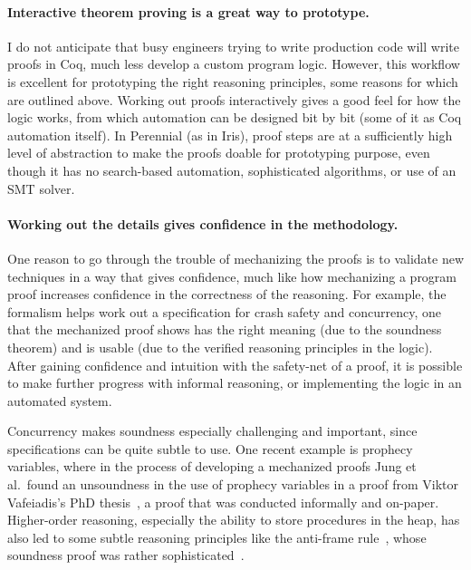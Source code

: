 \paragraph{Interactive theorem proving is a great way to prototype.} I do not
anticipate that busy engineers trying to write production code will write proofs
in Coq, much less develop a custom program logic. However, this workflow is
excellent for prototyping the right reasoning principles, some reasons for which
are outlined above. Working out proofs interactively gives a good feel for how
the logic works, from which automation can be designed bit by bit (some of it as
Coq automation itself). In Perennial (as in Iris), proof steps are at a
sufficiently high level of abstraction to make the proofs doable for prototyping
purpose, even though it has no search-based automation, sophisticated
algorithms, or use of an SMT solver.


\paragraph{Working out the details gives confidence in the methodology.} One
reason to go through the trouble of mechanizing the proofs is to validate new
techniques in a way that gives confidence, much like how mechanizing a program proof increases
confidence in the correctness of the reasoning. For example, the formalism helps
work out a specification for crash safety and concurrency, one that the
mechanized proof shows has the right meaning (due to the soundness theorem) and
is usable (due to the verified reasoning principles in the logic). After gaining
confidence and intuition with the safety-net of a proof, it is possible to make
further progress with informal reasoning, or
implementing the logic in an automated system.

Concurrency makes soundness especially challenging and important, since specifications can be quite
subtle to use. One recent example is prophecy variables, where in the process of
developing a mechanized proofs Jung et al.\ found an unsoundness in the use of
prophecy variables in a proof from Viktor Vafeiadis's PhD
thesis~\cite{jung:prophecy,vafeiadis-phd}, a proof that was conducted informally
and on-paper. Higher-order reasoning, especially the ability to store procedures
in the heap, has also led to some subtle reasoning principles like the
anti-frame rule~\cite{pottier:anti-frame}, whose soundness proof was rather
sophisticated~\cite{schwinghammer:semantic-anti-frame}.


